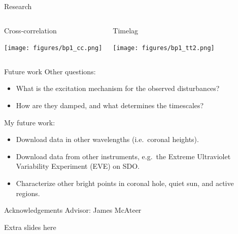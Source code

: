 \documentclass[table]{beamer}
\begin{document}
\begin{frame}{Research}
    \begin{columns}
        \begin{block}{\centering Cross-correlation}
            \begin{center}
                \texttt{[image: figures/bp1\_cc.png]}
            \end{center}
        \end{block}
        \begin{block}{\centering Timelag}
            \begin{center}
                \texttt{[image: figures/bp1\_tt2.png]}
            \end{center}
        \end{block}
    \end{columns}
\end{frame}%
\begin{frame}{Future work}
    Other questions:
    \begin{itemize}
        \item What is the excitation mechanism for the observed
            disturbances?
        \item How are they damped, and what determines the timescales?
    \end{itemize}
    My future work:
    \begin{itemize}
        \item Download data in other wavelengths (i.e.\ coronal heights).
        \item Download data from other instruments,
            e.g.\ the Extreme Ultraviolet Variability Experiment
            (EVE) on SDO\@.
        \item Characterize other bright points in coronal hole,
            quiet sun, and active regions.
    \end{itemize}
\end{frame}%
\begin{frame}{Acknowledgements}
    Advisor: James McAteer
\end{frame}%

\begin{frame}{Extra slides here}
\end{frame}
\end{document}
